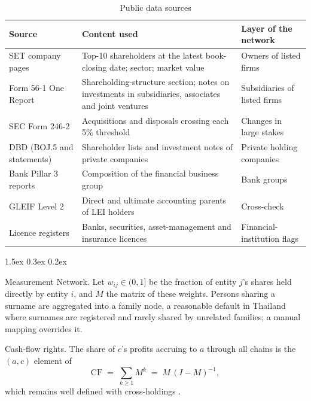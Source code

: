 \documentclass[11pt]{article}
\makeatletter
\renewcommand\section{\@startsection{section}{1}{\z@}{-2.0ex \@plus -0.5ex \@minus -0.2ex}%
  {1.5ex \@plus 0.3ex \@minus 0.2ex}{\large\bfseries\raggedright}}
\renewcommand\paragraph{\@startsection{paragraph}{4}{\z@}{1.5ex \@plus 0.5ex \@minus 0.2ex}{-1em}%
  {\normalsize\bfseries}}
\makeatother
\begin{document}
\begin{table}[t]
\centering\small
\caption{Public data sources}\label{tab:sources}
\begin{tabularx}{\textwidth}{lXl}
\toprule
Source & Content used & Layer of the network\\
\midrule
SET company pages & Top-10 shareholders at the latest book-closing date; sector; market value & Owners of listed firms\\
Form 56-1 One Report & Shareholding-structure section; notes on investments in subsidiaries, associates and joint ventures & Subsidiaries of listed firms\\
SEC Form 246-2 & Acquisitions and disposals crossing each 5\% threshold & Changes in large stakes\\
DBD (BOJ.5 and statements) & Shareholder lists and investment notes of private companies & Private holding companies\\
Bank Pillar 3 reports & Composition of the financial business group & Bank groups\\
GLEIF Level 2 & Direct and ultimate accounting parents of LEI holders & Cross-check\\
Licence registers & Banks, securities, asset-management and insurance licences & Financial-institution flags\\
\bottomrule
\end{tabularx}
\end{table}

\begin{table}[t]
\centering\small
\caption{Coverage of the network}\label{tab:coverage}

\end{table}

\section{Measurement}\label{sec:method}
\paragraph{Network.} Let $w_{ij}\in(0,1]$ be the fraction of entity $j$'s shares held directly by entity $i$, and $M$
the matrix of these weights. Persons sharing a surname are aggregated into a family node, a reasonable default in
Thailand where surnames are registered and rarely shared by unrelated families; a manual mapping overrides it.

\paragraph{Cash-flow rights.} The share of $c$'s profits accruing to $a$ through all chains is the $(a,c)$ element of
\begin{equation}
\mathrm{CF} \;=\; \sum_{k\ge 1} M^{k} \;=\; M\,(I-M)^{-1},
\end{equation}
which remains well defined with cross-holdings \citep{brioschi1989}.
\end{document}
